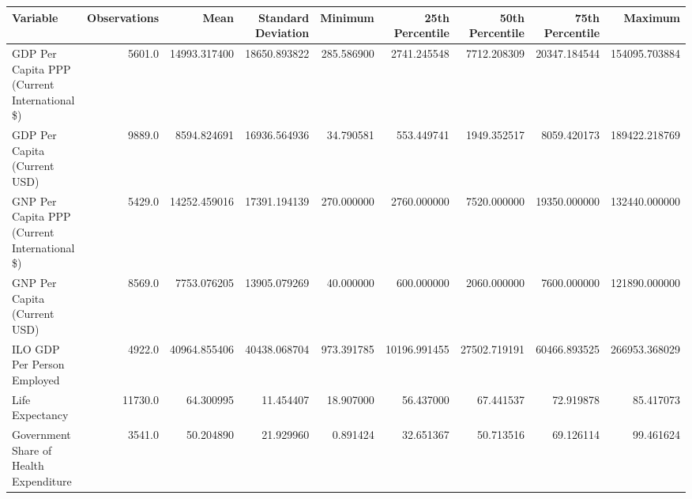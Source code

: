 \begin{tabular}{lrrrrrrrr}
\toprule
                                    Variable &  Observations &         Mean &  Standard Deviation &    Minimum &  25th Percentile &  50th Percentile &  75th Percentile &       Maximum \\
\midrule
GDP Per Capita PPP (Current International \$) & 5601.0 & 14993.317400 & 18650.893822 & 285.586900 & 2741.245548 & 7712.208309 & 20347.184544 & 154095.703884 \\
GDP Per Capita (Current USD) & 9889.0 & 8594.824691 & 16936.564936 & 34.790581 & 553.449741 & 1949.352517 & 8059.420173 & 189422.218769 \\
GNP Per Capita PPP (Current International \$) & 5429.0 & 14252.459016 & 17391.194139 & 270.000000 & 2760.000000 & 7520.000000 & 19350.000000 & 132440.000000 \\
GNP Per Capita (Current USD) & 8569.0 & 7753.076205 & 13905.079269 & 40.000000 & 600.000000 & 2060.000000 & 7600.000000 & 121890.000000 \\
ILO GDP Per Person Employed & 4922.0 & 40964.855406 & 40438.068704 & 973.391785 & 10196.991455 & 27502.719191 & 60466.893525 & 266953.368029 \\
Life Expectancy & 11730.0 & 64.300995 & 11.454407 & 18.907000 & 56.437000 & 67.441537 & 72.919878 & 85.417073 \\
Government Share of Health Expenditure & 3541.0 & 50.204890 & 21.929960 & 0.891424 & 32.651367 & 50.713516 & 69.126114 & 99.461624 \\
\bottomrule
\end{tabular}
